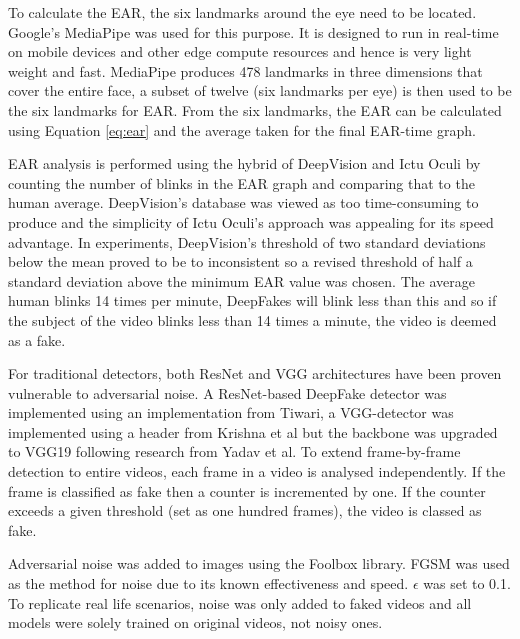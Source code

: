 To calculate the EAR, the six landmarks around the eye need to be located. Google's MediaPipe\cite{lugaresi2019mediapipe} was used for this purpose. It is designed to run in real-time on mobile devices and other edge compute resources and hence is very light weight and fast. MediaPipe produces 478 landmarks in three dimensions that cover the entire face, a subset of twelve (six landmarks per eye) is then used to be the six landmarks for EAR. From the six landmarks, the EAR can be calculated using Equation \ref{eq:ear} and the average taken for the final EAR-time graph. 

EAR analysis is performed using the hybrid of DeepVision\cite{jung2020deepvision} and Ictu Oculi\cite{li2018ictu} by counting the number of blinks in the EAR graph and comparing that to the human average. DeepVision's database was viewed as too time-consuming to produce and the simplicity of Ictu Oculi's approach was appealing for its speed advantage. In experiments, DeepVision's threshold of two standard deviations below the mean proved to be to inconsistent so a revised threshold of half a standard deviation above the minimum EAR value was chosen. The average human blinks 14 times per minute\cite{schiffman1990sensation}, DeepFakes will blink less than this and so if the subject of the video blinks less than 14 times a minute, the video is deemed as a fake.

For traditional detectors, both ResNet and VGG architectures have been proven vulnerable to adversarial noise\cite{gandhi2020adversarial}. A ResNet-based DeepFake detector was implemented using an implementation from Tiwari\cite{tiwari2024deepfake}, a VGG-detector was implemented using a header from Krishna et al\cite{krishna2022deepfake} but the backbone was upgraded to VGG19 following research from Yadav et al\cite{yadav2024deepfake}. To extend frame-by-frame detection to entire videos, each frame in a video is analysed independently. If the frame is classified as fake then a counter is incremented by one. If the counter exceeds a given threshold (set as one hundred frames), the video is classed as fake.

Adversarial noise was added to images using the Foolbox library\cite{rauber2017foolbox}\cite{rauber2017foolboxnative}. FGSM was used as the method for noise due to its known effectiveness and speed\cite{gandhi2020adversarial}. $\epsilon$ was set to 0.1. To replicate real life scenarios, noise was only added to faked videos and all models were solely trained on original videos, not noisy ones.

